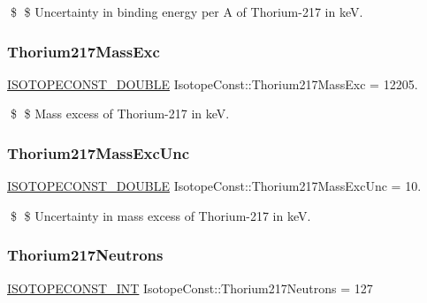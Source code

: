 \$ \$ Uncertainty in binding energy per A of Thorium-\/217 in keV. \mbox{\label{group___isotope_const-_thorium-_th217_ga2e8e84e09ddcaa11a527daaad08a72c4}} 
\subsubsection{\texorpdfstring{Thorium217\+Mass\+Exc}{Thorium217MassExc}}
{\footnotesize\ttfamily \mbox{\hyperlink{group___isotope_const-_macros_ga8f45a7272ce02c0b4c65c44636ed719a}{I\+S\+O\+T\+O\+P\+E\+C\+O\+N\+S\+T\+\_\+\+D\+O\+U\+B\+LE}} Isotope\+Const\+::\+Thorium217\+Mass\+Exc = 12205.}

\$ \$ Mass excess of Thorium-\/217 in keV. \mbox{\label{group___isotope_const-_thorium-_th217_ga5be26d70557f6ccff6cfca760135e190}} 
\subsubsection{\texorpdfstring{Thorium217\+Mass\+Exc\+Unc}{Thorium217MassExcUnc}}
{\footnotesize\ttfamily \mbox{\hyperlink{group___isotope_const-_macros_ga8f45a7272ce02c0b4c65c44636ed719a}{I\+S\+O\+T\+O\+P\+E\+C\+O\+N\+S\+T\+\_\+\+D\+O\+U\+B\+LE}} Isotope\+Const\+::\+Thorium217\+Mass\+Exc\+Unc = 10.}

\$ \$ Uncertainty in mass excess of Thorium-\/217 in keV. \mbox{\label{group___isotope_const-_thorium-_th217_gafab5d68564b73f0adc2585251a7c4d43}} 
\subsubsection{\texorpdfstring{Thorium217\+Neutrons}{Thorium217Neutrons}}
{\footnotesize\ttfamily \mbox{\hyperlink{group___isotope_const-_macros_ga5f18360b3e99483a35c32d789e62621c}{I\+S\+O\+T\+O\+P\+E\+C\+O\+N\+S\+T\+\_\+\+I\+NT}} Isotope\+Const\+::\+Thorium217\+Neutrons = 127}

